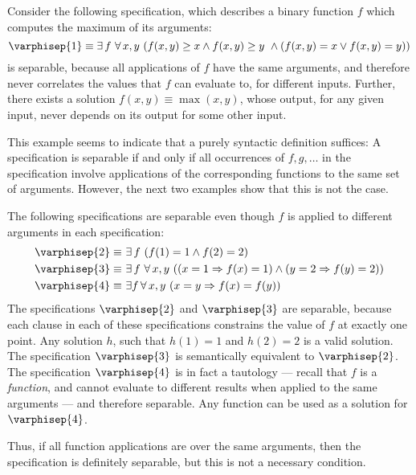 \begin{example}
Consider the following specification, which describes a binary
function $f$ which computes the maximum of its arguments:
\begin{equation}
\varphisep{1} \equiv \exists\,f\ \forall\,x, y\ (f(x, y) \ge x \wedge
  f(x, y) \ge y \ \wedge (f(x, y) = x \vee f(x, y) = y))
\label{eqn:max_spec}
\end{equation}
 is separable, because all applications of $f$ have the
same arguments, and therefore never correlates the values that $f$ can
evaluate to, for different inputs. Further, there exists a solution
$f(x, y) \equiv \max(x, y)$, whose output, for any given input, never
depends on its output for some other input.
\end{example}
\noindent
This example seems to indicate that a purely syntactic definition
suffices: A specification is separable if and only if all occurrences
of $f, g, \ldots$ in the specification involve applications of the
corresponding functions to the same set of arguments. However, the
next two examples show that this is not the case.
\begin{example}
The following specifications are separable even though $f$
is applied to different arguments in each specification:
\begin{align*}
\varphisep{2} \equiv\ & \exists\,f\ (f(1) = 1 \wedge f(2) = 2)\\
\varphisep{3} \equiv\ & \exists\,f\ \forall\,x, y\ ((x = 1 \Rightarrow f(x)
= 1) \wedge (y = 2 \Rightarrow f(y) = 2))\\
\varphisep{4} \equiv\ & \exists f\,\forall\,x, y\ (x = y
\Rightarrow f(x) = f(y))
\end{align*}
The specifications $\varphisep{2}$ and $\varphisep{3}$ are separable,
because each clause in each of these specifications constrains the
value of $f$ at exactly one point. Any solution $h$, such that $h(1) =
1$ and $h(2) = 2$ is a valid solution. The specification
$\varphisep{3}$ is semantically equivalent to $\varphisep{2}$. The
specification $\varphisep{4}$ is in fact a tautology --- recall that
$f$ is a \emph{function}, and cannot evaluate to different results
when applied to the same arguments --- and therefore separable. Any
function can be used as a solution for $\varphisep{4}$.
\end{example}
\noindent
Thus, if all function applications are over the same arguments, then
the specification is definitely separable, but this is not a necessary
condition.
